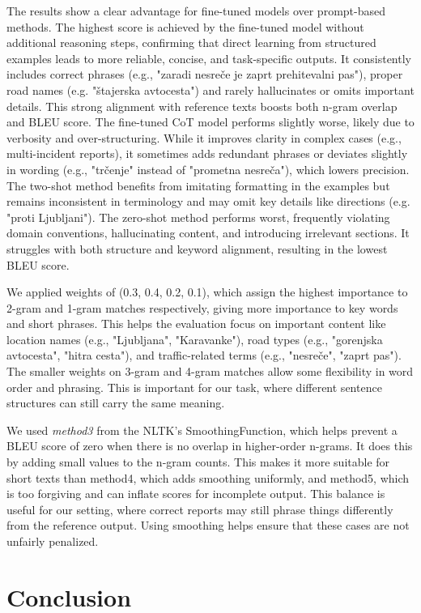 \documentclass[fleqn,moreauthors,10pt]{ds_report}
\begin{document}
The results show a clear advantage for fine-tuned models over prompt-based methods. The highest score is achieved by the fine-tuned model without additional reasoning steps, confirming that direct learning from structured examples leads to more reliable, concise, and task-specific outputs. It consistently includes correct phrases (e.g., "zaradi nesreče je zaprt prehitevalni pas"), proper road names (e.g. "štajerska avtocesta") and rarely hallucinates or omits important details. This strong alignment with reference texts boosts both n-gram overlap and BLEU score. The fine-tuned CoT model performs slightly worse, likely due to verbosity and over-structuring. While it improves clarity in complex cases (e.g., multi-incident reports), it sometimes adds redundant phrases or deviates slightly in wording (e.g., "trčenje" instead of "prometna nesreča"), which lowers precision. The two-shot method benefits from imitating formatting in the examples but remains inconsistent in terminology and may omit key details like directions (e.g. "proti Ljubljani"). The zero-shot method performs worst, frequently violating domain conventions, hallucinating content, and introducing irrelevant sections. It struggles with both structure and keyword alignment, resulting in the lowest BLEU score.

We applied weights of (0.3, 0.4, 0.2, 0.1), which assign the highest importance to 2-gram and 1-gram matches respectively, giving more importance to key words and short phrases. This helps the evaluation focus on important content like location names (e.g., "Ljubljana", "Karavanke"), road types (e.g., "gorenjska avtocesta", "hitra cesta"), and traffic-related terms (e.g., "nesreče", "zaprt pas"). The smaller weights on 3-gram and 4-gram matches allow some flexibility in word order and phrasing. This is important for our task, where different sentence structures can still carry the same meaning.

We used \textit{method3} from the NLTK's SmoothingFunction, which helps prevent a BLEU score of zero when there is no overlap in higher-order n-grams. It does this by adding small values to the n-gram counts. This makes it more suitable for short texts than method4, which adds smoothing uniformly, and method5, which is too forgiving and can inflate scores for incomplete output. This balance is useful for our setting, where correct reports may still phrase things differently from the reference output. Using smoothing helps ensure that these cases are not unfairly penalized.

\section*{Conclusion}
\end{document}
